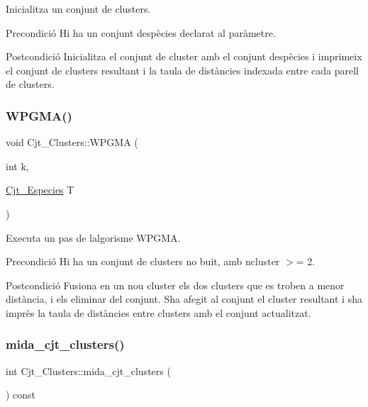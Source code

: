 Inicialitza un conjunt de clusters. 

\begin{DoxyPrecond}{Precondició}
Hi ha un conjunt d\textquotesingle{}espècies declarat al paràmetre. 
\end{DoxyPrecond}
\begin{DoxyPostcond}{Postcondició}
Inicialitza el conjunt de cluster amb el conjunt d\textquotesingle{}espècies i imprimeix el conjunt de clusters resultant i la taula de distàncies indexada entre cada parell de clusters. 
\end{DoxyPostcond}
\mbox{\label{class_cjt___clusters_a71ecc2306fc74d8d8308a034735bf894}} 
\subsubsection{\texorpdfstring{W\+P\+G\+M\+A()}{WPGMA()}}
{\footnotesize\ttfamily void Cjt\+\_\+\+Clusters\+::\+W\+P\+G\+MA (\begin{DoxyParamCaption}\item[{int}]{k,  }\item[{\hyperlink{class_cjt___especies}{Cjt\+\_\+\+Especies}}]{T }\end{DoxyParamCaption})}



Executa un pas de l\textquotesingle{}algorisme W\+P\+G\+MA. 

\begin{DoxyPrecond}{Precondició}
Hi ha un conjunt de clusters no buit, amb ncluster $>$= 2. 
\end{DoxyPrecond}
\begin{DoxyPostcond}{Postcondició}
Fusiona en un nou cluster els dos clusters que es troben a menor distància, i els eliminar del conjunt. S\textquotesingle{}ha afegit al conjunt el cluster resultant i s\textquotesingle{}ha imprès la taula de distàncies entre clusters amb el conjunt actualitzat. 
\end{DoxyPostcond}
\mbox{\label{class_cjt___clusters_af8b1e9dbb486ad03f9973ac72160bae1}} 
\subsubsection{\texorpdfstring{mida\+\_\+cjt\+\_\+clusters()}{mida\_cjt\_clusters()}}
{\footnotesize\ttfamily int Cjt\+\_\+\+Clusters\+::mida\+\_\+cjt\+\_\+clusters (\begin{DoxyParamCaption}{ }\end{DoxyParamCaption}) const}



